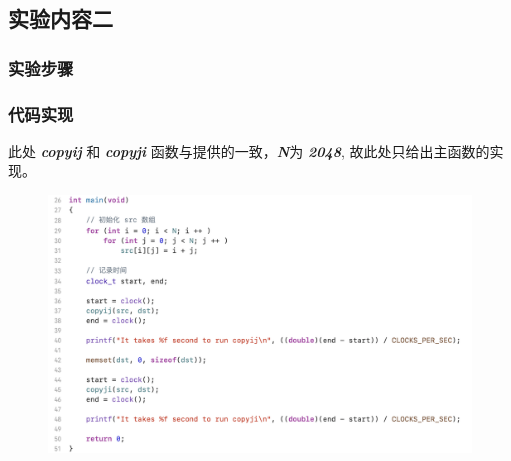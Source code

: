     \subsection{实验内容二}
        \subsubsection{实验步骤}
            \subsubsection*{代码实现}
                \par 此处 \textbf{\textit{copyij}} 和 \textbf{\textit{copyji}} 函数与提供的一致，\textbf{\textit{N}}为 \textbf{\textit{2048}}, 故此处只给出主函数的实现。
                \begin{figure}[htbp]
                    \includegraphics*[width = 15cm]{work2_s1.png}
                \end{figure}
